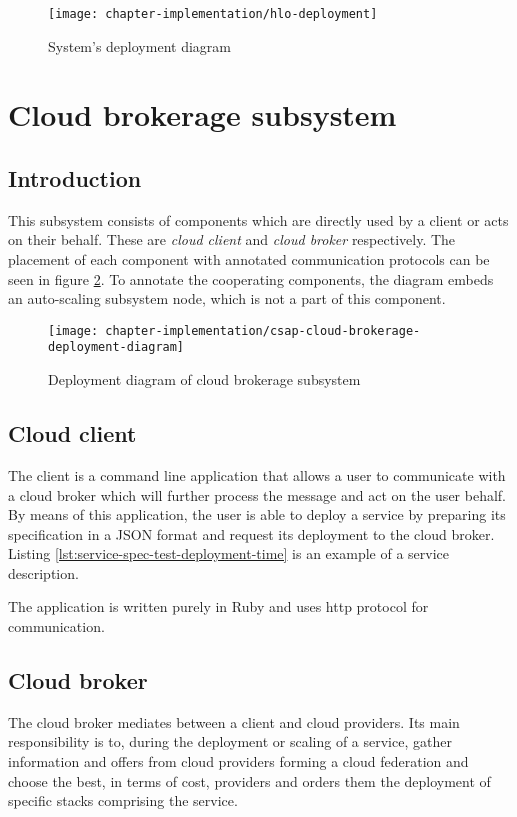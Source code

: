 \begin{figure}[!ht]
  \begin{center}
    \texttt{[image: chapter-implementation/hlo-deployment]}
  \end{center}
  \caption{System's deployment diagram}
  \label{fig:hlo-deployment}
\end{figure}

\section{Cloud brokerage subsystem}
\subsection{Introduction}
This subsystem consists of components which are directly used by a client or acts on their behalf. These are \emph{cloud client} and \emph{cloud broker} respectively. The placement of each component with annotated communication protocols can be seen in figure \ref{fig:csap-cloud-brokerage-deployment-diagram}. To annotate the cooperating components, the diagram embeds an auto-scaling subsystem node, which is not a part of this component.

\begin{figure}[!ht]
  \begin{center}
    \texttt{[image: chapter-implementation/csap-cloud-brokerage-deployment-diagram]}
  \end{center}
   \caption{Deployment diagram of cloud brokerage subsystem}
  \label{fig:csap-cloud-brokerage-deployment-diagram}
\end{figure}

\subsection{Cloud client}
The client is a command line application that allows a user to communicate with a cloud broker which will further process the message and act on the user behalf. By means of this application, the user is able to deploy a service by preparing its specification in a JSON format and request its deployment to the cloud broker. Listing \ref{lst:service-spec-test-deployment-time} is an example of a service description.

The application is written purely in Ruby and uses http protocol for communication. 

\subsection{Cloud broker}
The cloud broker mediates between a client and cloud providers. Its main responsibility is to, during the deployment or scaling of a service, gather information and offers from cloud providers forming a cloud federation and choose the best, in terms of cost, providers and orders them the deployment of specific stacks comprising the service.

